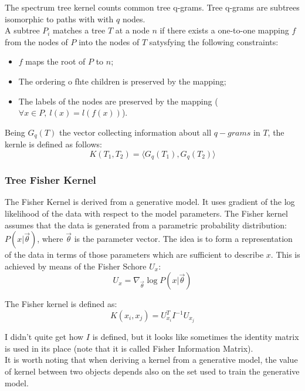 The spectrum tree kernel counts common
tree q-grams. Tree q-grams are subtrees isomorphic to paths with with $q$
nodes.\\
A subtree $P_i$ matches a tree $T$ at a node $n$ if there exists a one-to-one
mapping $f$ from the nodes of $P$ into the nodes of $T$ satysfying the following
constraints:
\begin{itemize}
	\item $f$ maps the root of $P$ to $n$;
	\item The ordering o fhte children is preserved by the mapping;
	\item The labels of the nodes are preserved by the mapping ($\forall x \in
	P, \ l(x) = l(f(x))$).
\end{itemize}

Being $G_q(T)$ the vector collecting information about all $q-grams$ in $T$, the
kernle is defined as follows:
\begin{equation}
	K(T_1, T_2) = \langle G_q(T_1), G_q(T_2) \rangle
\end{equation}

\subsubsection{Tree Fisher Kernel}

The Fisher Kernel is derived from a generative model. It uses gradient of the
log likelihood of the data with respect to the model parameters. The Fisher
kernel assumes that the data is generated from a parametric probability
distribution: $P(x|\vec{\theta})$, where $\vec{\theta}$ is the parameter vector.
The idea is to form a representation of the data in terms of those parameters
which are sufficient to describe $x$. This is achieved by means of the Fisher
Schore $U_x$:
\begin{equation}
	U_x = \nabla_{\vec{\theta}} \log P(x|\vec{\theta})
\end{equation}

The Fisher kernel is defined as:
\begin{equation}
	K(x_i, x_j) = U_{x_i}^T I^{-1} U_{x_j}
\end{equation}

I didn't quite get how $I$ is defined, but it looks like sometimes the identity
matrix is used in its place (note that it is called Fisher Information
Matrix).\\
It is worth noting that when deriving a kernel from a generative model, the
value of kernel between two objects depends also on the set used to
train the generative model.

